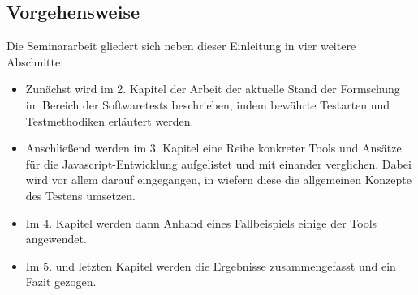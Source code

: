 \subsection{Vorgehensweise}

Die Seminararbeit gliedert sich neben dieser Einleitung in vier weitere Abschnitte:
\begin{itemize}
	\item Zunächst wird im 2. Kapitel der Arbeit der aktuelle Stand der Formschung im Bereich der Softwaretests beschrieben, indem bewährte Testarten und Testmethodiken erläutert werden.
	\item Anschließend werden im 3. Kapitel eine Reihe konkreter Tools und Ansätze für die Javascript-Entwicklung aufgelistet und mit einander verglichen. Dabei wird vor allem darauf eingegangen, in wiefern diese die allgemeinen Konzepte des Testens umsetzen.
	\item Im 4. Kapitel werden dann Anhand eines Fallbeispiels einige der Tools angewendet.
	\item Im 5. und letzten Kapitel werden die Ergebnisse zusammengefasst und ein Fazit gezogen.
\end{itemize}

